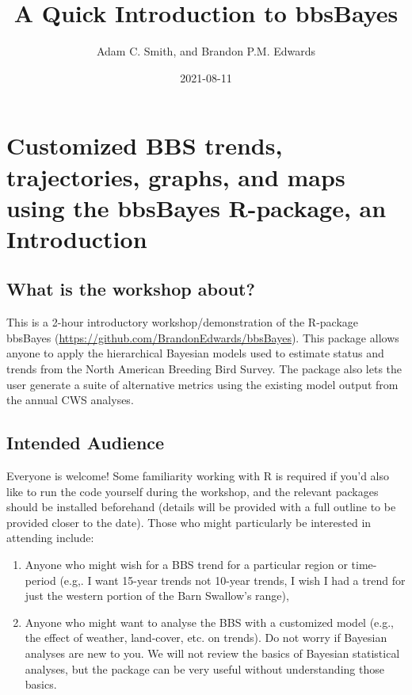 \documentclass[
]{book}
\title{A Quick Introduction to bbsBayes}
\author{Adam C. Smith, and Brandon P.M. Edwards}
\date{2021-08-11}
\begin{document}
\maketitle

{
\setcounter{tocdepth}{1}
\tableofcontents
}
\hypertarget{customized-bbs-trends-trajectories-graphs-and-maps-using-the-bbsbayes-r-package-an-introduction}{%
\chapter{Customized BBS trends, trajectories, graphs, and maps using the bbsBayes R-package, an Introduction}\label{customized-bbs-trends-trajectories-graphs-and-maps-using-the-bbsbayes-r-package-an-introduction}}

\hypertarget{what-is-the-workshop-about}{%
\section{What is the workshop about?}\label{what-is-the-workshop-about}}

This is a 2-hour introductory workshop/demonstration of the R-package
bbsBayes (\url{https://github.com/BrandonEdwards/bbsBayes}). This package
allows anyone to apply the hierarchical Bayesian models used to estimate
status and trends from the North American Breeding Bird Survey. The
package also lets the user generate a suite of alternative metrics using
the existing model output from the annual CWS analyses.

\hypertarget{intended-audience}{%
\section{Intended Audience}\label{intended-audience}}

Everyone is welcome! Some familiarity working with R is required if
you'd also like to run the code yourself during the workshop, and the
relevant packages should be installed beforehand (details will be
provided with a full outline to be provided closer to the date). Those
who might particularly be interested in attending include:

\begin{enumerate}
\def\labelenumi{\arabic{enumi}.}
\item
  Anyone who might wish for a BBS trend for a particular region or
  time-period (e.g,. I want 15-year trends not 10-year trends, I wish
  I had a trend for just the western portion of the Barn Swallow's
  range),
\item
  Anyone who might want to analyse the BBS with a customized model
  (e.g., the effect of weather, land-cover, etc. on trends). Do not
  worry if Bayesian analyses are new to you. We will not review the
  basics of Bayesian statistical analyses, but the package can be very
  useful without understanding those basics.
\end{enumerate}
\end{document}
